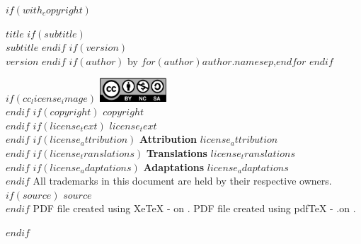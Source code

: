 \documentclass[
    $if(fontsize)$$fontsize$$else$10pt$endif$,
    $if(papersize)$$papersize$paper$else$letterpaper$endif$,
    titlepage,
    oneside,
    openright,
    $if(is_draft)$draft$else$final$endif$,
    article]{memoir}
\begin{document}
%
%
$if(with_copyright)$
    \thispagestyle{empty}
    \begin{flushleft}
        {\bfseries $title$}
        $if(subtitle)$
            {\\\itshape $subtitle$}
        $endif$
        $if(version)$
            {\normalsize{}\\$version$}
        $endif$
        \hfill\newline
        $if(author)$
            \normalsize by
            $for(author)$\normalsize $author.name$$sep$,\space$endfor$
        $endif$
        \vspace*{1em}

        \vspace*{1.5em}
        $if(cc_license_image)$
            \includegraphics[keepaspectratio=true, width=2.5cm]
                {cc_by_nc_sa_40.eps}\\[1.2em]
        $endif$
        \justify
        $if(copyright)$
            \normalsize $copyright$\\[1.2em]
        $endif$
        $if(license_text)$
            \normalsize $license_text$\\[1.2em]
        $endif$
        $if(license_attribution)$
            \normalsize {\bfseries Attribution}\textemdash%
                 $license_attribution$\\[1.2em]
        $endif$
        $if(license_translations)$
            \normalsize {\bfseries Translations}\textemdash%
                $license_translations$\\[1.2em]
        $endif$
        $if(license_adaptations)$
            \normalsize {\bfseries Adaptations}\textemdash%
                $license_adaptations$\\[1.2em]
        $endif$
        \normalsize All trademarks in this document are held by their %
            respective owners.\\[1.2em]
        $if(source)$
            \normalsize $source$\\[1.2em]
        $endif$
        \ifxetex
            \normalsize PDF file created using XeTeX %
                \the\eTeXversion\eTeXrevision-%
                \the\XeTeXversion\XeTeXrevision\space on \DTMnow.
        \else
            \normalsize PDF file created using pdfTeX %
                \the\eTeXversion\eTeXrevision-%
                \the\pdftexversion.\pdftexrevision\space on \DTMnow.
        \fi
    \end{flushleft}
    \pagebreak
    \cleardoublepage
$endif$
\end{document}
